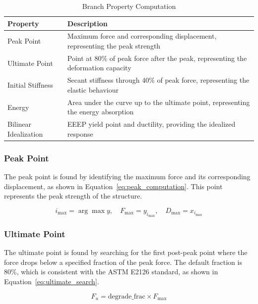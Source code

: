 \documentclass[11pt,a4paper]{article}
\begin{document}
\begin{table}[h]
\centering
\caption{Branch Property Computation}\label{tab:properties_algorithm}
\begin{tabular}{p{4cm}p{10cm}}
\toprule
\textbf{Property} & \textbf{Description} \\
\midrule
Peak Point & Maximum force and corresponding displacement, representing the peak strength \\
Ultimate Point & Point at 80\% of peak force after the peak, representing the deformation capacity \\
Initial Stiffness & Secant stiffness through 40\% of peak force, representing the elastic behaviour \\
Energy & Area under the curve up to the ultimate point, representing the energy absorption \\
Bilinear Idealization & EEEP yield point and ductility, providing the idealized response \\
\bottomrule
\end{tabular}
\end{table}

\subsubsection{Peak Point}

The peak point is found by identifying the maximum force and its corresponding displacement, as shown in Equation~\ref{eq:peak_computation}. This point represents the peak strength of the structure.

\begin{equation}
i_{\max} = \arg\max y, \quad F_{\max} = y_{i_{\max}}, \quad D_{\max} = x_{i_{\max}}
\label{eq:peak_computation}
\end{equation}

\subsubsection{Ultimate Point}

The ultimate point is found by searching for the first post-peak point where the force drops below a specified fraction of the peak force. The default fraction is 80\%, which is consistent with the ASTM E2126 standard, as shown in Equation~\ref{eq:ultimate_search}.

\begin{equation}
F_u = \text{degrade\_frac} \times F_{\max}
\label{eq:ultimate_search}
\end{equation}
\end{document}
